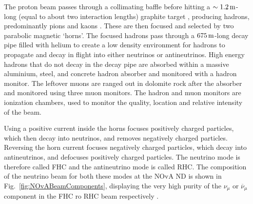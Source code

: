 The proton beam passes through a collimating baffle before hitting a $\sim\unit[1.2]{m}$-long (equal to about two interaction lengths) graphite target \cite{LEOFluxPredictionAtNuMI.pdf}, producing hadrons, predominantly pions and kaons \cite{NuMI.pdf}. These are then focused and selected by two parabolic magnetic `horns'. The focused hadrons pass through a $\unit[675]{m}$-long decay pipe filled with helium to create a low density environment for hadrons to propagate and decay in flight into either neutrinos or antineutrinos. High energy hadrons that do not decay in the decay pipe are absorbed within a massive aluminium, steel, and concrete hadron absorber and monitored with a hadron monitor. The leftover muons are ranged out in dolomite rock after the absorber and monitored using three muon monitors. The hadron and muon monitors are ionization chambers, used to monitor the quality, location and relative intensity of the beam.

Using a positive current inside the horns focuses positively charged particles, which then decay into neutrinos, and removes negatively charged particles. Reversing the horn current focuses negatively charged particles, which decay into antineutrinos, and defocuses positively charged particles. The neutrino mode is therefore called \gls{FHC} and the antineutrino mode is called \gls{RHC}. The composition of the neutrino beam for both these modes at the \gls{NOvA} \gls{ND} is shown in Fig.~\ref{fig:NOvABeamComponents}, displaying the very high purity of the $\nu_\mu$ or $\overline{\nu}_\mu$ component in the \gls{FHC} ro \gls{RHC} beam respectively \cite{NuMI.pdf}.

